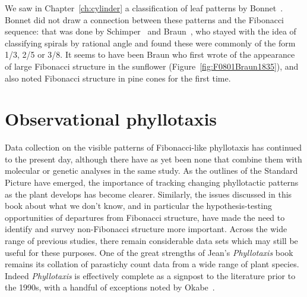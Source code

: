   
  We saw in Chapter~\ref{ch:cylinder} a classification of leaf patterns by Bonnet~\autocite{bonnetRecherchesUsageFeuilles1754}. Bonnet did not draw a connection between these patterns and the Fibonacci sequence: that was done by Schimper~\cite{schimperBeschreibungSymphytumZeyheri1835} and Braun~\cites{braunDrCarlSchimper1835, braunVergleichendeUntersuchungUber1831}, who stayed with the idea of classifying spirals by rational angle and found these were commonly of the form 1/3, 2/5 or 3/8. It seems to have been Braun who first wrote of the appearance of large Fibonacci structure in the sunflower (Figure~\ref{fig:F0801Braun1835}), and also noted Fibonacci structure in pine cones for the first time. 
  
  \section{Observational phyllotaxis}
  Data collection on the visible patterns of Fibonacci-like phyllotaxis has continued to the present day, although there have as yet been none that combine them with molecular or genetic analyses in the same study.
  As the outlines of the Standard Picture have emerged, the importance of tracking changing phyllotactic patterns as the plant develops has become clearer. Similarly, the issues discussed in this book about what we don't know, and in particular the hypothesis-testing opportunities of departures from Fibonacci structure, have made the need to identify and survey non-Fibonacci structure more important. Across the wide range of previous studies, there remain considerable data sets which may still be useful for these purposes.  One of the great strengths of Jean's \textit{Phyllotaxis} book remains its collation of parastichy count data from a wide range of plant species. Indeed \textit{Phyllotaxis} is effectively complete as a signpost to the literature prior to the 1990s, with a handful of exceptions
  noted by Okabe~\autocite{okabeRiddlePhyllotaxisExquisite2016}.
 
